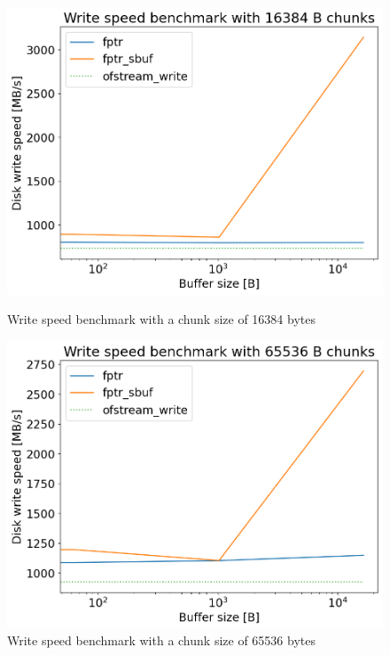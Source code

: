   \begin{figure}[H]
    \centering
    \begin{minipage}{.45\textwidth}
      \centering
      \includegraphics[width=\linewidth]{media/write_bench_16384.png}
      \caption{Write speed benchmark with a chunk size of 16384 bytes}
      \label{fig:write_bench_16384}
    \end{minipage}%
    \hfill
    \begin{minipage}{.45\textwidth}
      \centering
      \includegraphics[width=\linewidth]{media/write_bench_65536.png}
      \caption{Write speed benchmark with a chunk size of 65536 bytes}
      \label{fig:write_bench_65536}
    \end{minipage}
  \end{figure}

